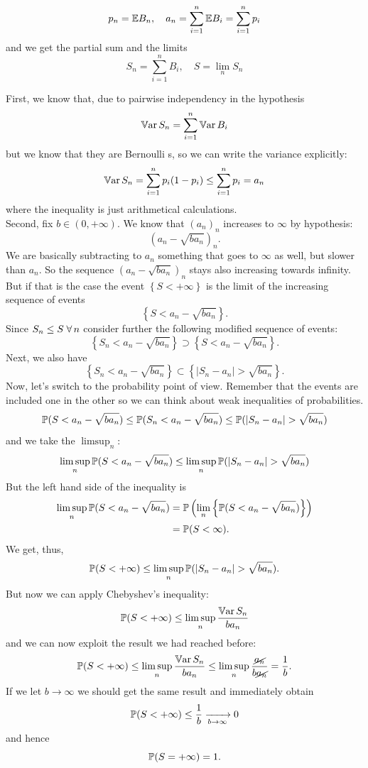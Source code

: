 \documentclass{report}
\begin{document}
\begin{fancyproof}
	\begin{notation}
		\[p_n=\mathbb{E} B_n,\quad a_n=\sum_{i=1}^n\mathbb{E} B_i=\sum_{i=1}^{n}p_i\]
		and we get the partial sum and the limits
		\[S_n=\sum_{i=1}^{n}B_i,\quad S=\lim_n S_n\]
	\end{notation}
	First, we know that, due to pairwise independency in the hypothesis
	\[\mathbb{V}\mathrm{ar}\, S_n=\sum_{i=1}^{n}\mathbb{V}\mathrm{ar}\, B_i\]
	but we know that they are Bernoulli \rv s, so we can write the variance explicitly:
	\[\mathbb{V}\mathrm{ar}\, S_n=\sum_{i=1}^{n}p_i(1-p_i)\leq\sum_{i=1}^{n}p_i=a_n\]
	where the inequality is just arithmetical calculations.\\
	 Second, fix $b\in(0,+\infty)$. We know that ${(a_n)}_{n}$ increases to $\infty$ by hypothesis:
	 \[\left(a_n-\sqrt{ba_n}\right)_n.\]
	 We are basically subtracting to $a_n$ something that goes to $\infty$ as well, but slower than $a_n$. So the sequence $\left(a_n-\sqrt{ba_n}\right)_n$ stays also increasing towards infinity. But if that is the case the event $\left\{S<+\infty\right\}$ is the limit of the increasing sequence of events
	 \[\left\{S<a_n-\sqrt{ba_n}\right\}.\]
	 Since $S_n\leq S\;\forall\, n$ consider further the following modified sequence of events:
	 \[\left\{S_n<a_n-\sqrt{ba_n}\right\}\supset\left\{S<a_n-\sqrt{ba_n}\right\}.\]
	 Next, we also have
	 \[\left\{S_n<a_n-\sqrt{ba_n}\right\}\subset\left\{|S_n-a_n|>\sqrt{ba_n}\right\}.\]
	 Now, let's switch to the probability point of view. Remember that the events are included one in the other so we can think about weak inequalities of probabilities.
	 \[\pr(S<a_n-\sqrt{ba_n})\leq\pr(S_n<a_n-\sqrt{ba_n})\leq\pr(|S_n-a_n|>\sqrt{ba_n})\]
	 and we take the $\limsup_n$:
	 \[\limsup_n\pr(S<a_n-\sqrt{ba_n})\leq\limsup_n\pr(|S_n-a_n|>\sqrt{ba_n})\]
	 But the left hand side of the inequality is
	\begin{align*}
		 \limsup_n\mathbb{P}(S<a_n-\sqrt{ba_n})&=\mathbb{P}\left(\lim_{n}\left\{\mathbb{P}(S<a_n-\sqrt{ba_n})\right\}\right)\\
		 &=\mathbb{P}(S<\infty).
	\end{align*}
	We get, thus,
	\[\pr(S<+\infty)\leq\limsup_n\pr(|S_n-a_n|>\sqrt{ba_n}).\]
	But now we can apply Chebyshev's inequality:
	\[\mathbb{P}(S<+\infty)\leq\limsup_n\frac{\mathbb{V}\mathrm{ar}\, S_n}{b a_n}\]
	and we can now exploit the result we had reached before:
	\[\mathbb{P}(S<+\infty)\leq\limsup_n\frac{\mathbb{V}\mathrm{ar}\, S_n}{b a_n}\leq\limsup_n\frac{\cancel{a_n}}{b\cancel{a_n}}=\frac{1}{b}.\]
	If we let $b\to\infty$ we should get the same result and immediately obtain
	\[\mathbb{P}(S<+\infty)\leq\frac{1}{b}\xrightarrow[b\to\infty]{}0\]
	and hence
	\[\mathbb{P}(S=+\infty)=1.\]
\end{fancyproof}
\end{document}
